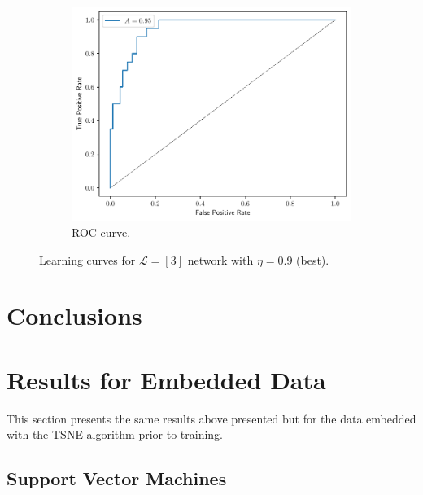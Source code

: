 \documentclass[conference]{IEEEtran}
\theoremstyle{definition}
\theoremstyle{remark}
\theoremstyle{remark}
\begin{document}
\begin{figure}
\begin{subfigure}[b]{0.32\textwidth}
        \includegraphics[width=\textwidth]{figs/3-0.9-roc.pdf}
        \caption{ROC curve.}
    \end{subfigure}
    \caption{Learning curves for $\mathcal{L}=[3]$ network with $\eta=0.9$
    (best).}
    \label{fig:NN-best}
\end{figure}

\section{Conclusions}\label{sec:conc}

\printbibliography

\appendices

\section{Results for Embedded Data}
This section presents the same results above presented but for the data
embedded with the TSNE algorithm prior to training.
\subsection{Support Vector Machines}
\end{document}
